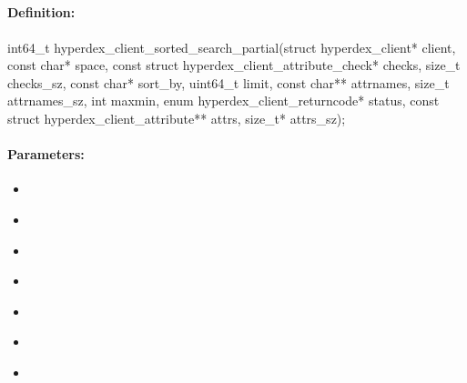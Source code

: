 \pagebreak
\subsection{}
\label{api:c:sorted_search_partial}


\paragraph{Definition:}
\begin{ccode}
int64_t hyperdex_client_sorted_search_partial(struct hyperdex_client* client,
        const char* space,
        const struct hyperdex_client_attribute_check* checks, size_t checks_sz,
        const char* sort_by,
        uint64_t limit,
        const char** attrnames, size_t attrnames_sz,
        int maxmin,
        enum hyperdex_client_returncode* status,
        const struct hyperdex_client_attribute** attrs, size_t* attrs_sz);
\end{ccode}

\paragraph{Parameters:}
\begin{itemize}[noitemsep]
\item {}\\

\item {}\\

\item {}\\

\item {}\\

\item {}\\

\item {}\\

\item {}\\

\end{itemize}

